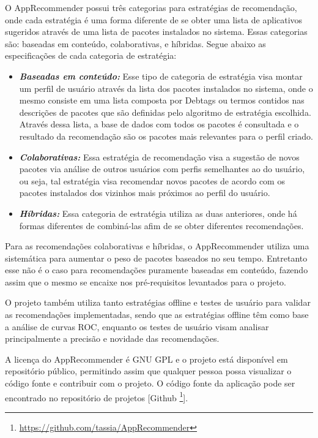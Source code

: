 O AppRecommender possui três categorias para estratégias de recomendação, onde cada
estratégia é uma forma diferente de se obter uma lista de aplicativos sugeridos
através de uma lista de pacotes instalados no sistema. Essas categorias são: baseadas em conteúdo,
colaborativas, e híbridas. Segue abaixo as especificações de cada categoria de estratégia:

\begin{itemize}
    \item \textit{\textbf{Baseadas em conteúdo:}} Esse tipo de categoria de estratégia
        visa montar um perfil de usuário através da lista dos pacotes instalados no sistema,
        onde o mesmo consiste em uma lista composta por Debtags ou termos contidos nas descrições de pacotes que são
        definidas pelo algoritmo de estratégia escolhida. Através dessa lista, a base de dados
        com todos os pacotes é consultada e o resultado da recomendação são os pacotes mais
        relevantes para o perfil criado.
    \item \textit{\textbf{Colaborativas:}} Essa estratégia de recomendação visa
        a sugestão de novos pacotes via análise de outros usuários com perfis
        semelhantes ao do usuário, ou seja, tal estratégia visa recomendar novos
        pacotes de acordo com os pacotes instalados dos vizinhos mais próximos
        ao perfil do usuário.
    \item \textit{\textbf{Híbridas:}} Essa categoria
        de estratégia utiliza as duas anteriores, onde há formas diferentes de combiná-las
        afim de se obter diferentes recomendações.
\end{itemize}

Para as recomendações colaborativas e híbridas, o AppRecommender
utiliza uma sistemática para aumentar o peso de pacotes baseados no seu tempo.
Entretanto esse não é o caso para recomendações puramente baseadas em conteúdo,
fazendo assim que o mesmo se encaixe nos pré-requisitos levantados para o
projeto.

O projeto também utiliza tanto estratégias offline e testes de usuário para
validar as recomendações implementadas, sendo que as estratégias offline têm como
base a análise de curvas ROC, enquanto os testes de usuário visam analisar
principalmente a precisão e novidade das recomendações.

A licença do AppRecommender é GNU GPL e o projeto está disponível em repositório
público, permitindo assim que qualquer pessoa possa visualizar o código fonte e
contribuir com o projeto. O código fonte da aplicação pode ser encontrado no
repositório de projetos [Github \footnote{\url{https://github.com/tassia/AppRecommender}}].

